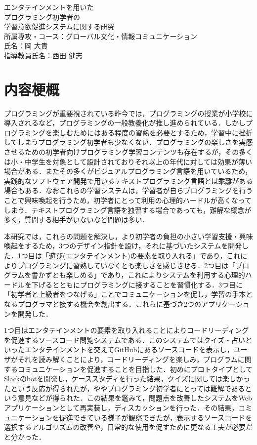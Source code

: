 \begin{center}
  {\Large エンタテインメントを用いた\\プログラミング初学者の\\学習意欲促進システムに関する研究}\\
  \vspace{20truept}
    \large{所属専攻・コース：グローバル文化・情報コミュニケーション\\}
    \large{氏名：岡 大貴\\}
    \large{指導教員氏名：西田 健志\\}
\end{center}

\section*{内容梗概}

プログラミングが重要視されている昨今では，プログラミングの授業が小学校に導入されるなど，プログラミングの一般教養化が推し進められている．しかしプログラミングを楽しむためにはある程度の習熟を必要とするため，学習中に挫折してしまうプログラミング初学者も少なくない．プログラミングの楽しさを実感させるための初学者向けプログラミング学習コンテンツも存在するが，その多くは小・中学生を対象として設計されておりそれ以上の年代に対しては効果が薄い場合がある．またその多くがビジュアルプログラミング言語を用いているため，実践的なソフトウェア開発で用いるテキストプログラミング言語とは乖離がある場合もある．なおこれらの学習システムは，学習者が自らプログラミングを行うことで興味喚起を行うため，初学者にとって利用の心理的ハードルが高くなってしまう．テキストプログラミング言語を独習する場合であっても，難解な概念が多く，質問する相手がいないなど問題は多い．

本研究では，これらの問題を解決し，より初学者の負担の小さい学習支援・興味喚起をするため，3つのデザイン指針を設け，それに基づいたシステムを開発した．1つ目は「遊び(エンタテインメント)の要素を取り入れる」であり，これによりプログラミングに習熟していなくとも楽しさを感じさせる．2つ目は「プログラムを書かずとも楽しめる」であり，これによりシステムを利用する心理的ハードルを下げるとともにプログラミングに接することを習慣化する．3つ目に「初学者と上級者をつなげる」ことでコミュニケーションを促し，学習の手本となるプログラマと接する機会を創出する．これらに基づき2つのアプリケーションを開発した．

1つ目はエンタテインメントの要素を取り入れることによりコードリーディングを促進するソースコード閲覧システムである．このシステムではクイズ・占いといったエンタテインメントを交えてGitHubにあるソースコードを表示し，ユーザがそれを読み解くことにより，コードリーディングを楽しみ，プログラムに関するコミュニケーションを促進することを目指した．初めにプロトタイプとしてSlackのbotを開発し，ケーススタディを行った結果，クイズに関しては楽しかったという反応が得られたが，ややプログラミング初学者にとっては難解であるという意見などが得られた．この結果を鑑みて，問題点を改善したシステムをWebアプリケーションとして再実装し，ディスカッションを行った．その結果，コミュニケーションを促進できている様子が観察できたが，表示するソースコードを選択するアルゴリズムの改善や，日常的な使用を促すために更なる工夫が必要だと分かった．

